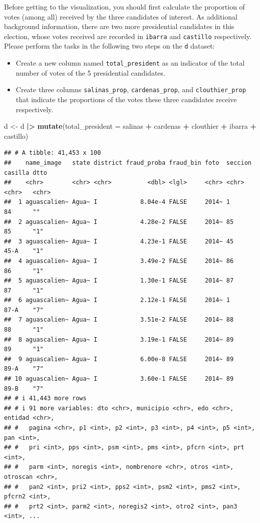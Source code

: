 \documentclass[
]{article}
\newenvironment{Shaded}{\begin{snugshade}}{\end{snugshade}}
\newcommand{\AttributeTok}[1]{\textcolor[rgb]{0.13,0.29,0.53}{#1}}
\newcommand{\FunctionTok}[1]{\textcolor[rgb]{0.13,0.29,0.53}{\textbf{#1}}}
\newcommand{\NormalTok}[1]{#1}
\newcommand{\OtherTok}[1]{\textcolor[rgb]{0.56,0.35,0.01}{#1}}
\newcommand{\SpecialCharTok}[1]{\textcolor[rgb]{0.81,0.36,0.00}{\textbf{#1}}}
\begin{document}
Before getting to the visualization, you should first calculate the
proportion of votes (among all) received by the three candidates of
interest. As additional background information, there are two more
presidential candidates in this election, whose votes received are
recorded in \texttt{ibarra} and \texttt{castillo} respectively. Please
perform the tasks in the following two steps on the \texttt{d} dataset:

\begin{itemize}
\item
  Create a new column named \texttt{total\_president} as an indicator of
  the total number of votes of the 5 presidential candidates.
\item
  Create three columns \texttt{salinas\_prop}, \texttt{cardenas\_prop},
  and \texttt{clouthier\_prop} that indicate the proportions of the
  votes these three candidates receive respectively.
\end{itemize}

\begin{Shaded}
\begin{Highlighting}[]
\NormalTok{d }\OtherTok{\textless{}{-}}\NormalTok{ d }\SpecialCharTok{|\textgreater{}}
  \FunctionTok{mutate}\NormalTok{(}\AttributeTok{total\_president =}\NormalTok{ salinas }\SpecialCharTok{+}\NormalTok{ cardenas }\SpecialCharTok{+}\NormalTok{ clouthier }\SpecialCharTok{+}\NormalTok{ ibarra }\SpecialCharTok{+}\NormalTok{ castillo)}
\end{Highlighting}
\end{Shaded}

\begin{verbatim}
## # A tibble: 41,453 x 100
##    name_image   state district fraud_proba fraud_bin foto  seccion casilla dtto 
##    <chr>        <chr> <chr>          <dbl> <lgl>     <chr> <chr>   <chr>   <chr>
##  1 aguascalien~ Agua~ I            8.04e-4 FALSE     2014~ 1       84      ""   
##  2 aguascalien~ Agua~ I            4.28e-2 FALSE     2014~ 85      85      "1"  
##  3 aguascalien~ Agua~ I            4.23e-1 FALSE     2014~ 45      45-A    "1"  
##  4 aguascalien~ Agua~ I            3.49e-2 FALSE     2014~ 86      86      "1"  
##  5 aguascalien~ Agua~ I            1.30e-1 FALSE     2014~ 87      87      "1"  
##  6 aguascalien~ Agua~ I            2.12e-1 FALSE     2014~ 1       87-A    "7"  
##  7 aguascalien~ Agua~ I            3.51e-2 FALSE     2014~ 88      88      "1"  
##  8 aguascalien~ Agua~ I            3.19e-1 FALSE     2014~ 89      89      "1"  
##  9 aguascalien~ Agua~ I            6.00e-8 FALSE     2014~ 89      89-A    "7"  
## 10 aguascalien~ Agua~ I            3.60e-1 FALSE     2014~ 89      89-B    "7"  
## # i 41,443 more rows
## # i 91 more variables: dto <chr>, municipio <chr>, edo <chr>, entidad <chr>,
## #   pagina <chr>, p1 <int>, p2 <int>, p3 <int>, p4 <int>, p5 <int>, pan <int>,
## #   pri <int>, pps <int>, psm <int>, pms <int>, pfcrn <int>, prt <int>,
## #   parm <int>, noregis <int>, nombrenore <chr>, otros <int>, otroscan <chr>,
## #   pan2 <int>, pri2 <int>, pps2 <int>, psm2 <int>, pms2 <int>, pfcrn2 <int>,
## #   prt2 <int>, parm2 <int>, noregis2 <int>, otro2 <int>, pan3 <int>, ...
\end{verbatim}
\end{document}
